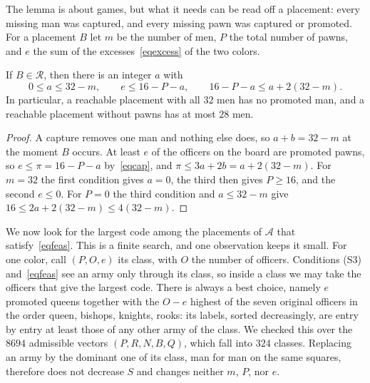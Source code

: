\documentclass[12pt,reqno]{article}
\newcommand{\adm}{\mathcal{A}}
\newcommand{\rea}{\mathcal{R}}
\begin{document}
The lemma is about games, but what it needs can be read off a placement: every missing man
was captured, and every missing pawn was captured or promoted. For a placement $B$ let $m$ be the number of men, $P$ the total number of pawns,
and $e$ the sum of the excesses~\eqref{eqexcess} of the two colors.

\begin{corollary}\label{corcap}
If $B\in\rea$, then there is an integer $a$ with
\begin{equation}\label{eqfeas}
0\leq a\leq 32-m,\qquad e\leq 16-P-a,\qquad 16-P-a\leq a+2(32-m) .
\end{equation}
In particular, a reachable placement with all $32$ men has no promoted man, and a reachable
placement without pawns has at most $28$ men.
\end{corollary}

\begin{proof}
A capture removes one man and nothing else does, so $a+b=32-m$ at the moment $B$
occurs. At least $e$ of the officers on the board are promoted pawns, so
$e\leq\pi=16-P-a$ by~\eqref{eqcap}, and $\pi\leq 3a+2b=a+2(32-m)$. For $m=32$ the first
condition gives $a=0$, the third then gives $P\geq 16$, and the second $e\leq 0$. For $P=0$
the third condition and $a\leq 32-m$ give $16\leq 2a+2(32-m)\leq 4(32-m)$.
\end{proof}

We now look for the largest code among the placements of $\adm$ that
satisfy~\eqref{eqfeas}. This is a finite search, and one observation keeps it small. For one
color, call $(P,O,e)$ its class, with $O$ the
number of officers. Conditions (S3) and~\eqref{eqfeas} see an army only through its class, so
inside a class we may take the officers that give the largest code. There is always a best choice,
namely $e$ promoted queens together with the $O-e$ highest of the seven original officers in the
order queen, bishops, knights, rooks: its labels, sorted decreasingly, are entry by entry at least
those of any other army of the class. We checked this over the $8694$ admissible vectors
$(P,R,N,B,Q)$, which fall into $324$ classes. Replacing an army by the dominant one of its class,
man for man on the same squares, therefore does not decrease $S$ and changes neither $m$, $P$,
nor $e$.
\end{document}
